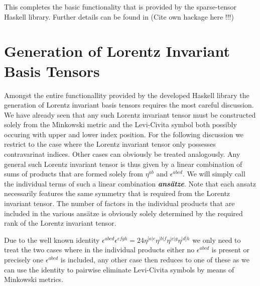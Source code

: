 \documentclass[a4paper,12pt, DIV=14, BCOR=5mm, twoside, headsepline]{scrbook}
\begin{document}
This completes the basic functionality that is provided by the sparse-tensor Haskell library. Further details can be found in (Cite own hackage here !!!)
\section{Generation of Lorentz Invariant Basis Tensors}\label{LorentzGen}
Amongst the entire functionallity provided by the developed Haskell library the generation of Lorentz invariant basis tensors requires the most careful discussion. We have already seen that any such Lorentz invariant tensor must be constructed solely from the Minkowski metric and the Levi-Civita symbol both possibly occuring with upper and lower index position. For the following discussion we restrict to the case where the Lorentz invariant tensor only possesses contravarinat indices. Other cases can obviously be treated analogously. Any general such Lorentz invariant tensor is thus given by a linear combination of sums of products that are formed solely from $\eta^{ab}$ and $\epsilon^{abcd}$.
We will simply call the individual terms of such a linear combination \textit{\textbf{ansätze}}. Note that each ansatz necessarily features the same symmetry that is required from the Lorentz invariant tensor. The number of factors in the individual products that are included in the various ansätze is obviously solely determined by the required rank of the Lorentz invariant tensor.

Due to the well known identity $\epsilon^{abcd}\epsilon^{efgh} = 24 \eta^{[a\vert e}\eta^{\vert b \vert f}\eta^{\vert c \vert g}\eta^{\vert d] h}$ we only need to treat the two cases where in the individual products either no $\epsilon^{abcd}$ is present or precisely one $\epsilon^{abcd}$ is included, any other case then reduces to one of these as we can use the identity to pairwise eliminate Levi-Civita symbols by means of Minkowski metrics. 
\end{document}
